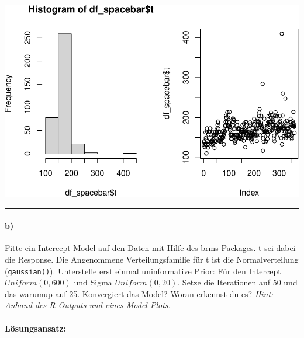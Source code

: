 \documentclass[
]{article}
\begin{document}
\includegraphics{Loesung-Zettel-2_files/figure-latex/loesung_a-1.pdf}

\begin{center}\rule{0.5\linewidth}{0.5pt}\end{center}

\hypertarget{b}{%
\paragraph{b)}\label{b}}

Fitte ein Intercept Model auf den Daten mit Hilfe des brms Packages. t
sei dabei die Response. Die Angenommene Verteilungsfamilie für t ist die
Normalverteilung (\texttt{gaussian()}). Unterstelle erst einmal
uninformative Prior: Für den Intercept \(Uniform(0, 600)\) und Sigma
\(Uniform(0, 20)\). Setze die Iterationen auf 50 und das warumup auf 25.
Konvergiert das Model? Woran erkennst du es?
\textit{Hint: Anhand des R Outputs und eines Model Plots.}

\hypertarget{luxf6sungsansatz-1}{%
\paragraph{Lösungsansatz:}\label{luxf6sungsansatz-1}}
\end{document}
